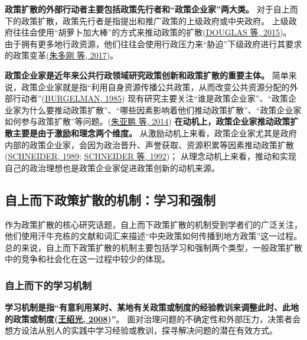 \documentclass[
  12pt,
]{ctexart}
\begin{document}
\textbf{政策扩散的外部行动者主要包括政策先行者和``政策企业家''两大类。}
对于自上而下的政策扩散，政策先行者是指提出和推广政策的上级政府或中央政府。
上级政府往往会使用``胡萝卜加大棒''的方式来推动政策的扩散(\protect\hyperlink{ref-DouglasEtAl2015}{DOUGLAS 等, 2015})。
由于拥有更多地行政资源，他们往往会使用行政压力来``胁迫''下级政府进行其要求的政策变革(\protect\hyperlink{ref-ZhuDuoGangHuZhenJi2017}{朱多刚 等, 2017})。

\textbf{政策企业家是近年来公共行政领域研究政策创新和政策扩散的重要主体。}
简单来说，政策企业家就是指``利用自身资源传播公共政策，从而改变公共资源分配的外部行动者''(\protect\hyperlink{ref-Burgelman1985}{BURGELMAN, 1985})
现有研究主要关注``谁是政策企业家''、``政策企业家为什么要推动政策扩散''、``哪些因素影响着他们推动政策扩散''、``政策企业家如何参与政策扩散''等问题。(\protect\hyperlink{ref-ZhuYaPengXiaoDiWen2014}{朱亚鹏 等, 2014})
\textbf{在动机上，政策企业家推动政策扩散主要是由于激励和理念两个维度。}
从激励动机上来看，政策企业家尤其是政府内部的政策企业家，会因为政治晋升、声誉获取、资源积累等因素推动政策扩散(\protect\hyperlink{ref-Schneider1989}{SCHNEIDER, 1989}; \protect\hyperlink{ref-SchneiderTeske1992}{SCHNEIDER 等, 1992})；
从理念动机上来看，推动和实现自己的政治理想也是政策企业家促进政策创新的动机来源。

\hypertarget{ux81eaux4e0aux800cux4e0bux653fux7b56ux6269ux6563ux7684ux673aux5236ux5b66ux4e60ux548cux5f3aux5236}{%
\subsection{自上而下政策扩散的机制：学习和强制}\label{ux81eaux4e0aux800cux4e0bux653fux7b56ux6269ux6563ux7684ux673aux5236ux5b66ux4e60ux548cux5f3aux5236}}

作为政策扩散的核心研究话题，自上而下政策扩散的机制受到学者们的广泛关注，他们使用汗牛充栋的文献和词汇来描述``中央政策如何传播到地方政策''这一过程。
总的来说，自上而下政策扩散的机制主要包括学习和强制两个类型，一般政策扩散中的竞争和社会化在这一过程中较少的体现。

\hypertarget{ux81eaux4e0aux800cux4e0bux7684ux5b66ux4e60ux673aux5236}{%
\subsubsection{自上而下的学习机制}\label{ux81eaux4e0aux800cux4e0bux7684ux5b66ux4e60ux673aux5236}}

\textbf{学习机制是指``有意利用某时、某地有关政策或制度的经验教训来调整此时、此地的政策或制度(\protect\hyperlink{ref-WangShaoGuang2008a}{王绍光, 2008})''}。
面对治理问题的不确定性和外部压力，决策者会想方设法从别人的实践中学习经验或教训，探寻解决问题的潜在有效方式。
\end{document}
